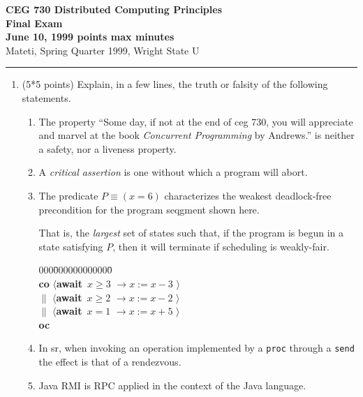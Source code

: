 \documentclass[12pt]{article}
\def\co{{\bf co}}
\def\oc{{\bf oc}}
\def\pa{{$\parallel$}}
\def\lb{$\langle$}
\def\rb{$\rangle$}
\def\ra{$\rightarrow$}
\def\await{{\bf await}}
\def\SR{{\sc sr}}
\begin{document}
{\bf CEG 
\large \bf 730 Distributed Computing Principles\\[5pt]
\large Final Exam\\[10pt]
June 10, 1999  points max  minutes\\
}
\bigskip
{Mateti,  Spring Quarter 1999, Wright State U}\\[-5pt]
\hrule

\begin{enumerate}
\item (5*5 points)
Explain, in a few lines, the truth or falsity of the following
statements.

\begin{enumerate}

\item  The property
``Some day, if not at the end of {\sc ceg} 730, you will appreciate
and marvel at the book {\em Concurrent Programming} by Andrews.''
is neither a safety, nor a liveness property.

\item
A {\em critical assertion} is one without which a program will abort.

\item The predicate $P \equiv (x = 6)$ characterizes the weakest
deadlock-free precondition for the program seqgment shown here.

\begin{minipage}{2.2in}
That is, the {\em largest} set of states such that, if the program is
begun in a state satisfying $P$, then it will terminate if scheduling
is weakly-fair.

\end{minipage}
\quad
\begin{minipage}{2in}
\begin{tabbing}
000\=000000000000\=\kill
\\
\co\> \lb \await\  $x \geq 3$ \>\ra $x := x - 3$ \rb\\
\pa\> \lb \await\  $x \geq 2$ \>\ra $x := x - 2$ \rb\\
\pa\> \lb \await\  $x = 1$ \>\ra $x := x + 5$ \rb\\
\oc\\
\end{tabbing}
\end{minipage}

\item
In \SR, when invoking an operation implemented by a {\tt proc} through
a {\tt send} the effect is that of a rendezvous.

\item
Java RMI is RPC applied in the context of the Java language.


\end{enumerate}
\end{enumerate}
\end{document}
